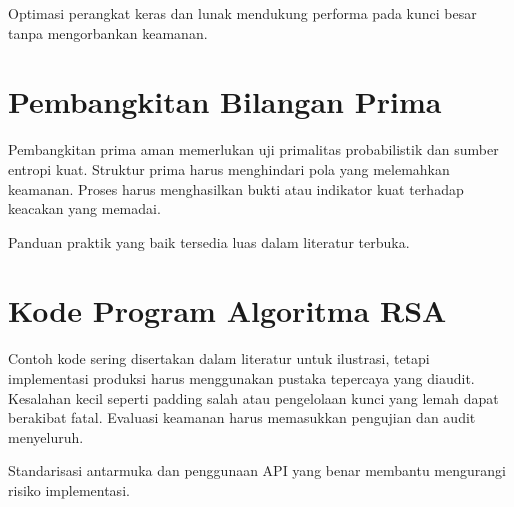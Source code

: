 \documentclass[../main.tex]{subfiles}
\begin{document}
Optimasi perangkat keras dan lunak mendukung performa pada kunci besar tanpa mengorbankan keamanan.

\section{Pembangkitan Bilangan Prima}
Pembangkitan prima aman memerlukan uji primalitas probabilistik dan sumber entropi kuat. Struktur prima harus menghindari pola yang melemahkan keamanan. Proses harus menghasilkan bukti atau indikator kuat terhadap keacakan yang memadai.

Panduan praktik yang baik tersedia luas dalam literatur terbuka.

\section{Kode Program Algoritma RSA}
Contoh kode sering disertakan dalam literatur untuk ilustrasi, tetapi implementasi produksi harus menggunakan pustaka tepercaya yang diaudit. Kesalahan kecil seperti padding salah atau pengelolaan kunci yang lemah dapat berakibat fatal. Evaluasi keamanan harus memasukkan pengujian dan audit menyeluruh.

Standarisasi antarmuka dan penggunaan API yang benar membantu mengurangi risiko implementasi.
\end{document}
